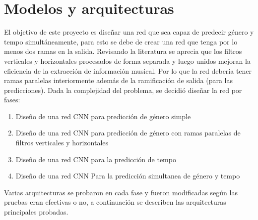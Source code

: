 \section{Modelos y arquitecturas}\label{sec:arquitecturas}
\noindent El objetivo de este proyecto es diseñar una red que sea capaz de predecir género y tempo simultáneamente, para esto se debe de crear una red que tenga por lo menos dos ramas en la salida. Revisando la literatura se aprecia que los filtros verticales y horizontales procesados de forma separada y luego unidos mejoran la eficiencia de la extracción de información musical. Por lo que la red debería tener ramas paralelas interiormente además de la ramificación de salida (para las predicciones). Dada la complejidad del problema, se decidió diseñar la red por fases:
\begin{enumerate}
\item Diseño de una red CNN para predicción de género simple
\item Diseño de una red CNN para predicción de género con ramas paralelas de filtros verticales y horizontales
\item Diseño de una red CNN para la predicción de tempo
\item Diseño de una red CNN Para la predicción simultanea de género y tempo
\end{enumerate}

Varias arquitecturas se probaron en cada fase y fueron modificadas según las pruebas eran efectivas o no, a continuación se describen las arquitecturas principales probadas.


